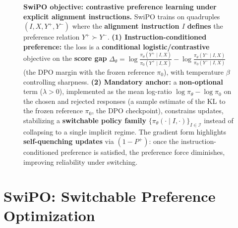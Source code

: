 \begin{figure}[ht!]
\vspace{-0.9em}
\caption{
\textbf{SwiPO objective: contrastive preference learning under explicit alignment instructions.}
SwiPO trains on quadruples $(I,X,Y^+,Y^-)$ where the \textbf{alignment instruction $I$} \textbf{defines} the preference relation $Y^+\succ Y^-$.
\textbf{(1) Instruction-conditioned preference:} the loss is a \textbf{conditional logistic/contrastive} objective on the \textbf{score gap}
$\Delta_\theta=\log \frac{\pi_\theta(Y^+\mid I,X)}{\pi_0(Y^+\mid I,X)}-\log \frac{\pi_\theta(Y^-\mid I,X)}{\pi_0(Y^-\mid I,X)}$ (the DPO margin with the frozen reference $\pi_0$), with temperature $\beta$ controlling sharpness.
\textbf{(2) Mandatory anchor:} a \textbf{non-optional} term ($\lambda>0$), implemented as the mean log-ratio $\log\pi_\theta-\log\pi_0$ on the chosen and rejected responses (a sample estimate of the KL to the frozen reference $\pi_0$, the DPO checkpoint), constrains updates,
stabilizing a \textbf{switchable policy family} $\{\pi_\theta(\cdot\mid I,\cdot)\}_{I\in\mathcal{I}}$ instead of collapsing to a single implicit regime.
The gradient form highlights \textbf{self-quenching updates} via $(1-P^+)$: once the instruction-conditioned preference is satisfied, the preference force diminishes, improving reliability under switching.
}
\label{fig:cita_objective_box}
\vspace{-1.2em}
\end{figure}



\section{SwiPO: Switchable Preference Optimization}
\label{sec:cita_framework}

